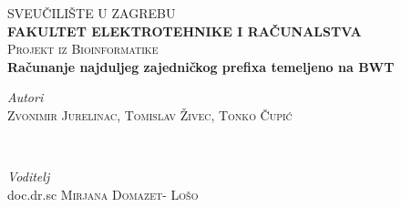 \documentclass[11pt]{article}
\begin{document}

\begin{titlepage} %
	
	\center %
	
	
	\textsc{\LARGE SVEU\v{C}ILI\v{S}TE U ZAGREBU}\\[0.4cm] %
	\textsc{\LARGE \textbf{FAKULTET ELEKTROTEHNIKE I RA\v{C}UNALSTVA}}\\[2.5cm]
    
	\textsc{\Large Projekt iz Bioinformatike}\\[0.5cm] %
	

	
	
	{\huge\bfseries Ra\v{c}unanje najduljeg zajedni\v{c}kog prefixa temeljeno na BWT}\\[1.2cm] %
	
	
	\begin{minipage}{2.5\textwidth}
		\begin{flushleft}
			\large
			\textit{Autori}\\
			 \textsc{Zvonimir Jurelinac, Tomislav Živec, Tonko Čupić} %
		\end{flushleft}
	\end{minipage}
	~\\[0.2cm]
	\begin{minipage}{2.5\textwidth}
		\begin{flushleft}
			\large
			\textit{Voditelj}\\
			doc.dr.sc \textsc{Mirjana Domazet- Lo\v{s}o} %
		\end{flushleft}
	\end{minipage}
	
	

\end{titlepage}
\end{document}

